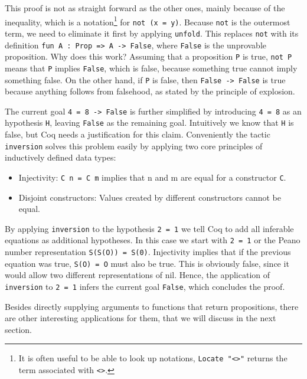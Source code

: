 \documentclass[paper = a4, fleqn, abstract=on, twoside]{scrreprt}
\newcommand{\todo}[1]{\marginpar{\textbf{TODO:} #1}}
\newcommand{\coqinline}[1]{\texttt{#1}}
\begin{document}
This proof is not as straight forward as the other ones, mainly because of the inequality, which is a notation\footnote{It is often useful to be able to look up notations, \coqinline{Locate "<>"} returns the term associated with \coqinline{<>}.} for \coqinline{not (x = y)}. Because \coqinline{not} is the outermost term, we need to eliminate it first by applying \coqinline{unfold}. This replaces \coqinline{not} with its definition \coqinline{fun A : Prop => A -> False}, where \coqinline{False} is the unprovable proposition. Why does this work?
Assuming that a proposition \coqinline{P} is true, \coqinline{not P} means that \coqinline{P} implies \coqinline{False}, which is false, because something true cannot imply something false. On the other hand, if \coqinline{P} is false, then \coqinline{False -> False} is true because anything follows from falsehood, as stated by the principle of explosion. \todo{verweis?}
\par
The current goal \coqinline{4 = 8 -> False} is further simplified by introducing \coqinline{4 = 8} as an hypothesis \coqinline{H}, leaving \coqinline{False} as the remaining goal. Intuitively we know that \coqinline{H} is false, but Coq needs a justification for this claim.
Conveniently the tactic \coqinline{inversion} solves this problem easily by applying two core principles of inductively defined data types:
\begin{itemize}
	\item Injectivity: \coqinline{C n = C m} implies that n and m are equal for a constructor \coqinline{C}.
	\item Disjoint constructors: Values created by different constructors cannot be equal.
\end{itemize}
By applying \coqinline{inversion} to the hypothesis \coqinline{2 = 1} we tell Coq to add all inferable equations as additional hypotheses. In this case we start with \coqinline{2 = 1} or the Peano number representation \coqinline{S(S(O)) = S(0)}. Injectivity implies that if the previous equation was true, \coqinline{S(O) = O} must also be true. This is obviously false, since it would allow two different representations of nil. Hence, the application of \coqinline{inversion} to \coqinline{2 = 1} infers the current goal \coqinline{False}, which concludes the proof.

Besides directly supplying arguments to functions that return propositions, there are other interesting applications for them, that we will discuss in the next section.
\end{document}
